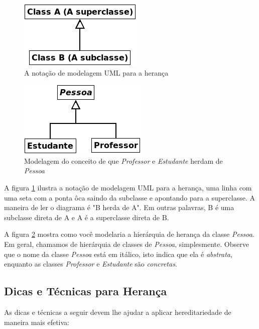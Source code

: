 \documentclass[
	article,			%
	12pt,				%
	openright,
	twoside,			%
	a4paper,			%
	english,			%
	french,
	brazil,				%
	sumario=tradicional
	]{abntex2}
\begin{document}
\begin{figure}[b]
\begin{center}
\includegraphics[scale=0.8]{uml1.png} 
\caption{A notação de modelagem UML para a herança} \label{fig:uml1}
\end{center}
\end{figure}

\begin{figure}
\begin{center}
\includegraphics[scale=0.8]{uml2.png} 
\caption{Modelagem do conceito de que \emph{Professor} e \emph{Estudante} herdam de \emph{Pessoa}} \label{fig:uml2}
\end{center}
\end{figure}

A figura \ref{fig:uml1} ilustra a notação de modelagem UML para a herança, uma linha com uma seta com a ponta ôca saindo da subclasse e apontando para a superclasse. A maneira de ler o diagrama é "B herda de A". Em outras palavras, B é uma subclasse direta de A e A é a superclasse direta de B.

A figura \ref{fig:uml2} mostra como você modelaria a hierárquia de herança da classe \emph{Pessoa}. Em geral, chamamos de hierárquia de classes de \emph{Pessoa}, simplesmente. Observe que o nome da classe \emph{Pessoa} está em itálico, isto indica que ela é \textit{abstrata}, enquanto as classes \emph{Professor} e \emph{Estudante} são \textit{concretas}.

\subsection{Dicas e Técnicas para Herança}

As dicas e técnicas a seguir devem lhe ajudar a aplicar hereditariedade de maneira mais efetiva:
\end{document}
